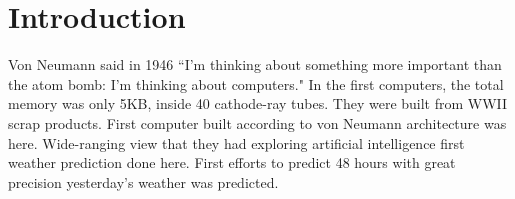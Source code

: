 \def\filepath{C:/Users/Owner/Dropbox/Math/templates}





%


%

\pagestyle{fancy}
\chead{} 
\lfoot{} 
\cfoot{\thepage} 
\rfoot{} 
\renewcommand{\headrulewidth}{.3pt} 
\setlength\voffset{0in}
\setlength\textheight{648pt}


\tableofcontents
\section*{Introduction}
%

Von Neumann said in 1946 ``I'm thinking about something more important than the atom bomb: I'm thinking about computers."
In the first computers, the total memory was only 5KB, inside 40 cathode-ray tubes. They were built from WWII scrap products. 
First computer built according to von Neumann architecture was here.
Wide-ranging view that they had exploring artificial intelligence
first weather prediction done here.
First efforts to predict 48 hours with great precision yesterday's weather was predicted.


